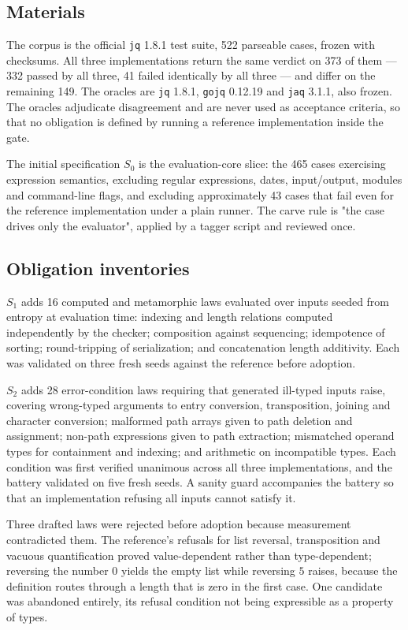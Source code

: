 \subsection{Materials}

The corpus is the official \texttt{jq} 1.8.1 test suite, 522 parseable
cases, frozen with checksums. All three implementations return the same
verdict on 373 of them --- 332 passed by all three, 41 failed
identically by all three --- and differ on the remaining 149. The oracles are \texttt{jq} 1.8.1,
\texttt{gojq} 0.12.19 and \texttt{jaq} 3.1.1, also frozen. The oracles
adjudicate disagreement and are never used as acceptance criteria, so
that no obligation is defined by running a reference implementation
inside the gate.

The initial specification $S_0$ is the evaluation-core slice: the 465
cases exercising expression semantics, excluding regular expressions,
dates, input/output, modules and command-line flags, and excluding
approximately 43 cases that fail even for the reference implementation
under a plain runner. The carve rule is "the case drives only the
evaluator", applied by a tagger script and reviewed once.

\subsection{Obligation inventories}

$S_1$ adds 16 computed and metamorphic laws evaluated over inputs seeded
from entropy at evaluation time: indexing and length relations computed
independently by the checker; composition against sequencing; idempotence
of sorting; round-tripping of serialization; and concatenation length
additivity. Each was validated on three fresh seeds against the
reference before adoption.

$S_2$ adds 28 error-condition laws requiring that generated ill-typed
inputs raise, covering wrong-typed arguments to entry conversion,
transposition, joining and character conversion; malformed path arrays
given to path deletion and assignment; non-path expressions given to path
extraction; mismatched operand types for containment and indexing; and
arithmetic on incompatible types. Each condition was first verified
unanimous across all three implementations, and the battery validated on
five fresh seeds. A sanity guard accompanies the battery so that an
implementation refusing all inputs cannot satisfy it.

Three drafted laws were rejected before adoption because measurement
contradicted them. The reference's refusals for list reversal,
transposition and vacuous quantification proved value-dependent rather
than type-dependent; reversing the number $0$ yields the empty list while
reversing $5$ raises, because the definition routes through a length that
is zero in the first case. One candidate was abandoned entirely, its
refusal condition not being expressible as a property of types.

